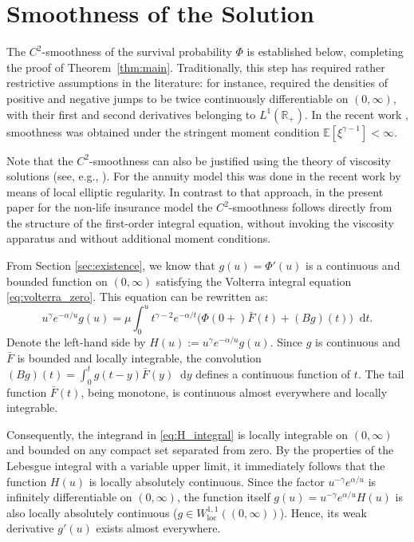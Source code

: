 \documentclass[smallextended]{svjour3}
\providecommand{\diff}{\mathop{}\!\mathrm{d}}
\begin{document}
\section{Smoothness of the Solution}

The $C^2$-smoothness of the survival probability $\Phi$ is established below, completing the proof of Theorem~\ref{thm:main}. Traditionally, this step has required rather restrictive assumptions in the literature: for instance, \cite{KP2022} required the densities of positive and negative jumps to be twice continuously differentiable on $(0,\infty)$, with their first and second derivatives belonging to $L^1(\mathbb{R}_+)$. In the recent work \cite{AK2026}, smoothness was obtained under the stringent moment condition $\mathbb{E}[\xi^{\gamma-1}] < \infty$.

Note that the $C^2$-smoothness can also be justified using the theory of viscosity solutions (see, e.g., \cite{BK2015}). For the annuity model this was done in the recent work \cite{Promyslov2026_Viscosity} by means of local elliptic regularity. In contrast to that approach, in the present paper for the non-life insurance model the $C^2$-smoothness follows directly from the structure of the first-order integral equation, without invoking the viscosity apparatus and without additional moment conditions.

From Section \ref{sec:existence}, we know that $g(u) = \Phi'(u)$ is a continuous and bounded function on $(0,\infty)$ satisfying the Volterra integral equation \eqref{eq:volterra_zero}. This equation can be rewritten as:
\begin{equation}\label{eq:H_integral}
u^\gamma e^{-\alpha/u} g(u) = \mu \int_0^u t^{\gamma-2} e^{-\alpha/t} \big( \Phi(0+) \bar{F}(t) + (Bg)(t) \big) \diff t.
\end{equation}
Denote the left-hand side by $H(u) := u^\gamma e^{-\alpha/u} g(u)$. Since $g$ is continuous and $\bar{F}$ is bounded and locally integrable, the convolution $(Bg)(t) = \int_0^t g(t-y)\bar{F}(y)\diff y$ defines a continuous function of $t$. The tail function $\bar{F}(t)$, being monotone, is continuous almost everywhere and locally integrable. 

Consequently, the integrand in \eqref{eq:H_integral} is locally integrable on $(0,\infty)$ and bounded on any compact set separated from zero. By the properties of the Lebesgue integral with a variable upper limit, it immediately follows that the function $H(u)$ is locally absolutely continuous. Since the factor $u^{-\gamma} e^{\alpha/u}$ is infinitely differentiable on $(0,\infty)$, the function itself $g(u) = u^{-\gamma} e^{\alpha/u} H(u)$ is also locally absolutely continuous ($g \in W^{1,1}_{\text{loc}}((0,\infty))$). Hence, its weak derivative $g'(u)$ exists almost everywhere.
\end{document}

